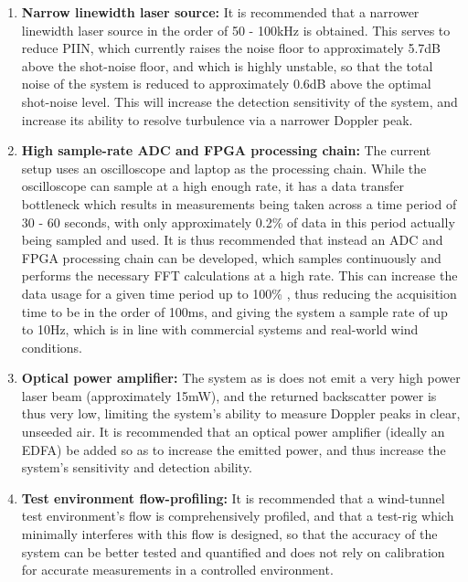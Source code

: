 \begin{enumerate}[label=\textbf{R\arabic*}]
	\item \textbf{Narrow linewidth laser source: } It is recommended that a narrower linewidth laser source in the order of 50 - 100kHz is obtained. This serves to reduce PIIN, which currently raises the noise floor to approximately 5.7dB above the shot-noise floor, and which is highly unstable, so that the total noise of the system is reduced to approximately 0.6dB above the optimal shot-noise level. This will increase the detection sensitivity of the system, and increase its ability to resolve turbulence via a narrower Doppler peak. \\
	
	\item  \textbf{High sample-rate ADC and FPGA processing chain:} The current setup uses an oscilloscope and laptop as the processing chain. While the oscilloscope can sample at a high enough rate, it has a data transfer bottleneck which results in measurements being taken across a time period of 30 - 60 seconds, with only approximately 0.2\% of data in this period actually being sampled and used. It is thus recommended that instead an ADC and FPGA processing chain can be developed, which samples continuously and performs the necessary FFT calculations at a high rate. This can increase the data usage for a given time period up to 100\% \cite{hill_remote_nodate}, thus reducing the acquisition time to be in the order of 100ms, and giving the system a sample rate of up to 10Hz, which is in line with commercial systems and real-world wind conditions.\\
	
	\item \textbf{Optical power amplifier: } The system as is does not emit a very high power laser beam (approximately 15mW), and the returned backscatter power is thus very low, limiting the system's ability to measure Doppler peaks in clear, unseeded air. It is recommended that an optical power amplifier (ideally an EDFA) be added so as to increase the emitted power, and thus increase the system's sensitivity and detection ability. \\
	
	\item \textbf{Test environment flow-profiling: } It is recommended that a wind-tunnel test environment's flow is comprehensively profiled, and that a test-rig which minimally interferes with this flow is designed, so that the accuracy of the system can be better tested and quantified and does not rely on calibration for accurate measurements in a controlled environment. \\
	

\end{enumerate}
